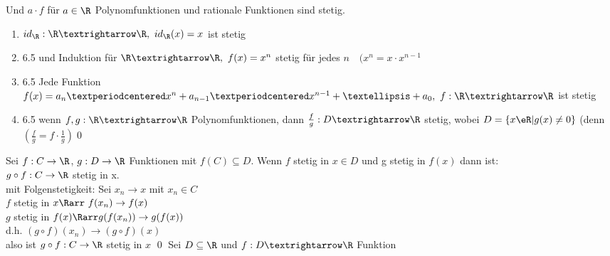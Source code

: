 Und $a \cdot f$ für $a \in \R$
Polynomfunktionen und rationale Funktionen sind stetig.
\bew
\begin{enumerate}
\item{$id_{\R}:\R→\R,\ id_{\R}(x)=x$ ist stetig}
\item{6.5 und Induktion \Rarr{} für $\R→\R,\ f(x)=x^n$ stetig für jedes $n\quad (x^n=x·x^{n-1}$}
\item{6.5 \Rarr{} Jede Funktion $f(x)=a_n·x^{n}+a_{n-1}·x^{n-1}+…+a_0,\ f:\R→\R$ ist stetig}
\item{6.5 \Rarr{} wenn $f,g:\R→\R$ Polynomfunktionen, dann $\frac{f}{g}:D→\R$ stetig, wobei $D=\{x\eR|g(x)\neq 0\}$ (denn $(\frac{f}{g}=f·\frac{1}{g})$\qed}
\end{enumerate}
Sei $f: C \to \R$, $g: D \to \R$ Funktionen mit $f(C) \subseteq D$. Wenn $f$ stetig in $x \in D$ und g stetig in $f(x)$ dann ist:\\
$g \circ f: C \to \R$ stetig in x.\\
\bew mit Folgenstetigkeit:
Sei $x_n \to x$ mit $x_n \in C$\\
$f$ stetig in $x \Rarr \ f(x_n) \to f(x)$\\
$g$ stetig in $f(x) \Rarr g(f(x_n)) \to g(f(x))$\\
d.h. $(g \circ f)(x_n) \to (g \circ f)(x)$\\
also ist $g \circ f: C \to \R$ stetig in $x$ \qed
{}
Sei $D\subseteq\R$ und $f:D→\R$ Funktion\\
